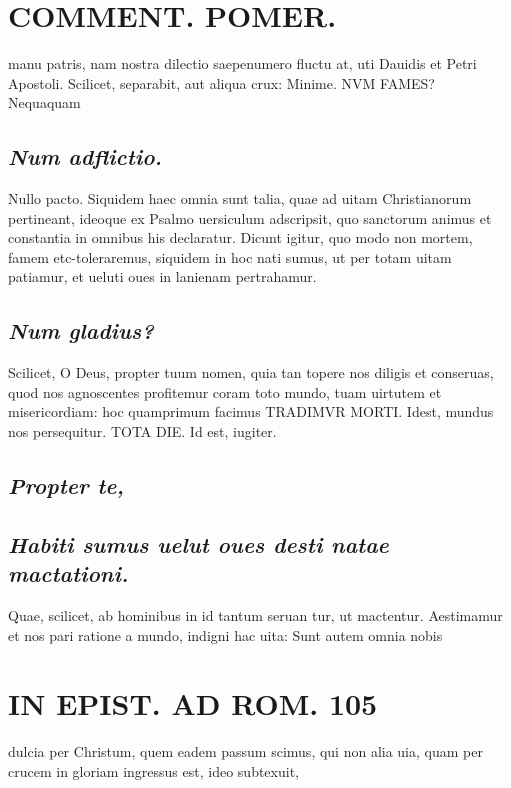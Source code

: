 \documentclass{article}
\begin{document}
\begin{pages}
\section*{COMMENT. POMER.  }\pstart manu patris, nam nostra dilectio saepenumero fluctu at, uti Dauidis et Petri Apostoli.  \pend\pstart Scilicet, separabit, aut aliqua crux: Minime. NVM FAMES? Nequaquam  \pend
{}
{}
\subsection*{\textit{Num adflictio. }}\pstart Nullo pacto. Siquidem haec omnia sunt talia, quae ad uitam Christianorum pertineant, ideoque ex Psalmo uersiculum adscripsit, quo sanctorum animus et constantia in omnibus his declaratur. Dicunt igitur, quo modo non mortem, famem etc-toleraremus, siquidem in hoc nati sumus, ut per totam uitam patiamur, et ueluti oues in lanienam pertrahamur.  \pend
{}
{}
\subsection*{\textit{Num gladius? }}\pstart Scilicet, O Deus, propter tuum nomen, quia tan topere nos diligis et conseruas, quod nos agnoscentes profitemur coram toto mundo, tuam uirtutem et misericordiam: hoc quamprimum facimus TRADIMVR MORTI. Idest, mundus nos persequitur. TOTA DIE. Id est, iugiter.   \pend
{}
{}
\subsection*{\textit{Propter te, }}
{}
\subsection*{\textit{Habiti sumus uelut oues desti  natae mactationi. }}\pstart Quae, scilicet, ab hominibus in id tantum seruan tur, ut mactentur. Aestimamur et nos pari ratione a mundo, indigni hac uita: Sunt autem omnia nobis  \pend
\section*{IN EPIST. AD ROM.  105 }
\marginpar{[ p.]}\pstart dulcia per Christum, quem eadem passum scimus, qui non alia uia, quam per crucem in gloriam ingressus est, ideo subtexuit,  \pend
{}
{}

\end{pages}
\end{document}
